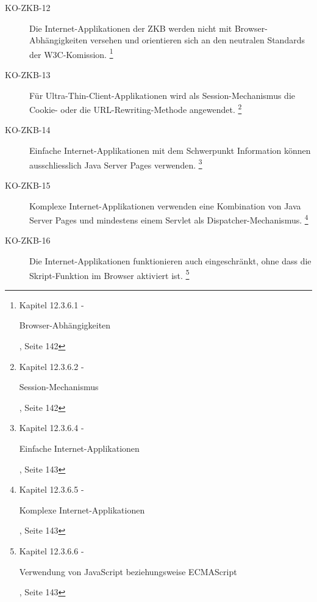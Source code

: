 \documentclass[
11pt, %
a4paper, %
BCOR25mm, %
DIV14, %
footsepline = false, %
headsepline, %
twoside, %
openright,
abstracton, %
listof=totocnumbered, %
bibliography=totocnumbered %
]{scrreprt}
\begin{document}
\begin{description}
    \item[KO-ZKB-12] Die Internet-Applikationen der ZKB werden nicht mit
    Browser-Abhängigkeiten versehen und orientieren sich an den neutralen
    Standards der W3C-Komission.
    \footnote{\cite{ZkbHandbuchDerItArchitektur} Kapitel 12.3.6.1 -
    \begin{itshape}Browser-Abhängigkeiten\end{itshape}, Seite 142}
    
    \item[KO-ZKB-13] Für Ultra-Thin-Client-Applikationen wird als
    Session-Mechanismus die Cookie- oder die URL-Rewriting-Methode angewendet.
    \footnote{\cite{ZkbHandbuchDerItArchitektur} Kapitel 12.3.6.2 -
    \begin{itshape}Session-Mechanismus\end{itshape}, Seite 142}
    
    \item[KO-ZKB-14] Einfache Internet-Applikationen mit dem Schwerpunkt
    Information können ausschliesslich Java Server Pages verwenden.
    \footnote{\cite{ZkbHandbuchDerItArchitektur} Kapitel 12.3.6.4 -
    \begin{itshape}Einfache Internet-Applikationen\end{itshape}, Seite 143}
    
    \item[KO-ZKB-15] Komplexe Internet-Applikationen verwenden eine Kombination
    von Java Server Pages und mindestens einem Servlet als Dispatcher-Mechanismus.
    \footnote{\cite{ZkbHandbuchDerItArchitektur} Kapitel 12.3.6.5 -
    \begin{itshape}Komplexe Internet-Applikationen\end{itshape}, Seite 143}
    
    \item[KO-ZKB-16] Die Internet-Applikationen funktionieren auch
    eingeschränkt, ohne dass die Skript-Funktion im Browser aktiviert ist.
    \footnote{\cite{ZkbHandbuchDerItArchitektur} Kapitel 12.3.6.6 -
    \begin{itshape}Verwendung von JavaScript beziehungsweise ECMAScript\end{itshape}, Seite 143}
    

\end{description}
\end{document}
